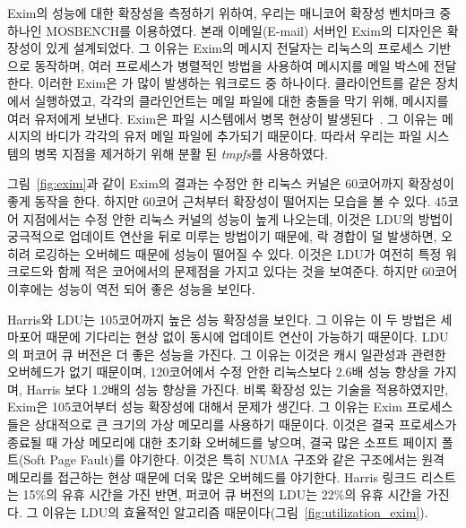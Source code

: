 Exim의 성능에 대한 확장성을 측정하기 위하여, 우리는 매니코어 확장성 벤치마크 중 하나인 MOSBENCH를 이용하였다. 
본래 이메일(E-mail) 서버인 Exim의 디자인은 확장성이 있게 설계되었다. 
그 이유는 Exim의 메시지 전달자는 리눅스의 프로세스 기반으로 동작하며, 
여러 프로세스가 병렬적인 방법을 사용하여 메시지를 메일 박스에 전달한다.
이러한 Exim은 가 많이 발생하는 워크로드 중 하나이다. 
클라이언트를 같은 장치에서 실행하였고, 
각각의 클라인언트는 메일 파일에 대한 충돌을 막기 위해, 메시지를 여러 유저에게 보낸다.
Exim은 파일 시스템에서 병목 현상이 발생된다~\cite{SilasBoydWickizer2010LinuxScales48}.
그 이유는 메시지의 바디가 각각의 유저 메일 파일에 추가되기 때문이다.
따라서 우리는 파일 시스템의 병목 지점을 제거하기 위해 분활 된 \textit{tmpfs}를 사용하였다. 

그림~\ref{fig:exim}과 같이 Exim의 결과는 수정안 한 리눅스 커널은 
60코어까지 확장성이 좋게 동작을 한다. 
하지만 60코어 근처부터 확장성이 떨어지는 모습을 볼 수 있다.
45코어 지점에서는 수정 안한 리눅스 커널의 성능이 높게 나오는데, 이것은 LDU의 방법이 
궁극적으로 업데이트 연산을 뒤로 미루는 방법이기 때문에, 락 경합이 덜 발생하면, 오히려 로깅하는 오버헤드 때문에 
성능이 떨어질 수 있다. 
이것은 LDU가 여전히 특정 워크로드와 함께 적은 코어에서의 문제점을 가지고 있다는 것을 보여준다.
하지만 60코어 이후에는 성능이 역전 되어 좋은 성능을 보인다. 

Harris와 LDU는 105코어까지 높은 성능 확장성을 보인다. 
그 이유는 이 두 방법은 세마포어 때문에 기다리는 현상 없이 동시에 업데이트 연산이 가능하기 때문이다. 
LDU의 퍼코어 큐 버전은 더 좋은 성능을 가진다.
그 이유는 이것은 캐시 일관성과 관련한 오버헤드가 없기 때문이며, 120코어에서 수정 안한 
리눅스보다 2.6배 성능 향상을 가지며, Harris 보다 1.2배의 성능 향상을 가진다.
비록 확장성 있는 기술을 적용하였지만, Exim은 105코어부터 성능 확장성에 대해서 문제가 생긴다.
그 이유는 Exim 프로세스들은 상대적으로 큰 크기의 가상 메모리를 사용하기 때문이다.
이것은 결국 프로세스가 종료될 때 가상 메모리에 대한 초기화 오버헤드를 낳으며,
결국 많은 소프트 페이지 폴트(Soft Page Fault)를 야기한다. 
이것은 특히 NUMA 구조와 같은 구조에서는 원격 메모리를 접근하는 현상 때문에 더욱 많은 오버헤드를 야기한다. 
Harris 링크드 리스트는 15\%의 유휴 시간을 가진 반면, 퍼코어 큐 버전의 LDU는 22\%의 유휴 시간을 가진다.
그 이유는 LDU의 효율적인 알고리즘 때문이다(그림~\ref{fig:utilization_exim}).

